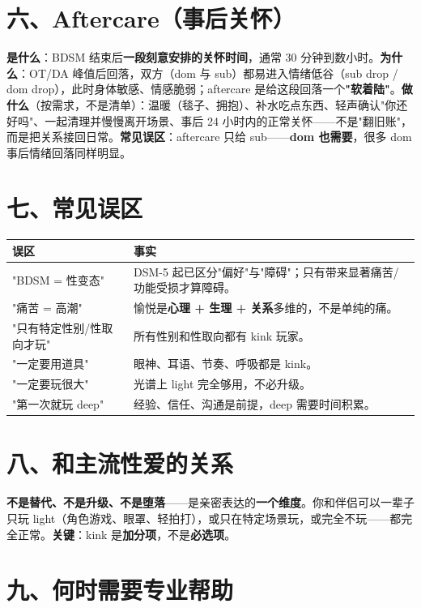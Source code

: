 \documentclass[12pt,UTF8,openany]{ctexbook}
\begin{document}
\section{六、Aftercare（事后关怀）}

\textbf{是什么}：BDSM 结束后\textbf{一段刻意安排的关怀时间}，通常 30 分钟到数小时。\textbf{为什么}：OT/DA 峰值后回落，双方（dom 与 sub）都易进入情绪低谷（sub drop / dom drop），此时身体敏感、情感脆弱；aftercare 是给这段回落一个\textbf{"软着陆"}。\textbf{做什么}（按需求，不是清单）：温暖（毯子、拥抱）、补水吃点东西、轻声确认"你还好吗"、一起清理并慢慢离开场景、事后 24 小时内的正常关怀——不是"翻旧账"，而是把关系接回日常。\textbf{常见误区}：aftercare 只给 sub——\textbf{dom 也需要}，很多 dom 事后情绪回落同样明显。

\section{七、常见误区}

\begin{tabularx}{\textwidth}{lX}
\toprule
\textbf{误区} & \textbf{事实} \\
\midrule
"BDSM = 性变态" & DSM-5 起已区分"偏好"与"障碍"；只有带来显著痛苦/功能受损才算障碍。 \\
"痛苦 = 高潮" & 愉悦是\textbf{心理 + 生理 + 关系}多维的，不是单纯的痛。 \\
"只有特定性别/性取向才玩" & 所有性别和性取向都有 kink 玩家。 \\
"一定要用道具" & 眼神、耳语、节奏、呼吸都是 kink。 \\
"一定要玩很大" & 光谱上 light 完全够用，不必升级。 \\
"第一次就玩 deep" & 经验、信任、沟通是前提，deep 需要时间积累。 \\
\bottomrule
\end{tabularx}

\section{八、和主流性爱的关系}

\textbf{不是替代、不是升级、不是堕落}——是亲密表达的\textbf{一个维度}。你和伴侣可以一辈子只玩 light（角色游戏、眼罩、轻拍打），或只在特定场景玩，或完全不玩——都完全正常。\textbf{关键}：kink 是\textbf{加分项}，不是\textbf{必选项}。

\section{九、何时需要专业帮助}
\end{document}

